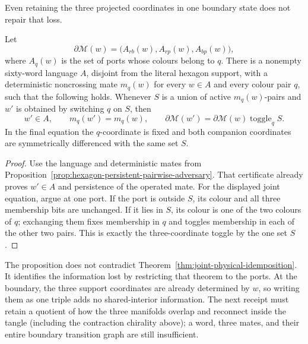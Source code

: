 Even retaining the three projected coordinates in one boundary state does
not repair that loss.

\begin{proposition}
\label{prop:hexagon-projected-joint-adversary}
Let
\[
 \partial\mathcal M(w)=
 \bigl(A_{rb}(w),A_{rp}(w),A_{bp}(w)\bigr),
\]
where \(A_q(w)\) is the set of ports whose colours belong to \(q\).
There is a nonempty sixty-word language \(A\), disjoint from the literal
hexagon support, with a deterministic noncrossing mate \(m_q(w)\) for every
\(w\in A\) and every colour pair \(q\), such that the following holds.
Whenever \(S\) is a union of active \(m_q(w)\)-pairs and \(w'\) is obtained
by switching \(q\) on \(S\), then
\[
 w'\in A,\qquad m_q(w')=m_q(w),\qquad
 \partial\mathcal M(w')
   =\partial\mathcal M(w)\mathbin{\operatorname{toggle}}_q S.
\]
In the final equation the \(q\)-coordinate is fixed and both companion
coordinates are symmetrically differenced with the same set \(S\).
\end{proposition}

\begin{proof}
Use the language and deterministic mates from
Proposition~\ref{prop:hexagon-persistent-pairwise-adversary}.  That
certificate already proves \(w'\in A\) and persistence of the operated mate.
For the displayed joint equation, argue at one port.  If the port is outside
\(S\), its colour and all three membership bits are unchanged.  If it lies in
\(S\), its colour is one of the two colours of \(q\); exchanging them fixes
membership in \(q\) and toggles membership in each of the other two pairs.
This is exactly the three-coordinate toggle by the one set \(S\).
\end{proof}

The proposition does not contradict
Theorem~\ref{thm:joint-physical-idemposition}.  It identifies the information
lost by restricting that theorem to the ports.  At the boundary, the three
support coordinates are already determined by \(w\), so writing them as one
triple adds no shared-interior information.  The next receipt must retain a
quotient of how the three manifolds overlap and reconnect inside the tangle
(including the contraction chirality above); a word, three mates, and their
entire boundary transition graph are still insufficient.

